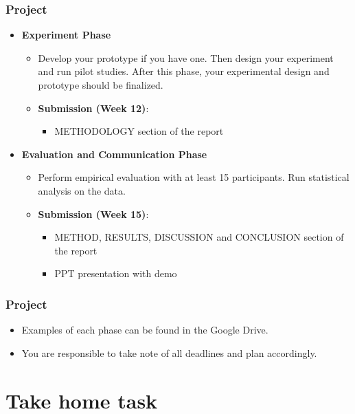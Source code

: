 \documentclass{beamer}
\begin{document}
\begin{frame}
\frametitle{Project}
\begin{itemize}
	\item \textbf{Experiment Phase}
	\begin{itemize}
		\item Develop your prototype if you have one.   Then design your experiment and run pilot studies.  After this phase, your experimental design and prototype should be finalized.
		\item \textbf{Submission (Week 12)}:
		\begin{itemize}
			\item METHODOLOGY section of the report
		\end{itemize}
	\end{itemize}
	\item \textbf{Evaluation and Communication Phase}
	\begin{itemize}
		\item Perform empirical evaluation with at least 15 participants.  Run statistical analysis on the data.  
		\item \textbf{Submission (Week 15)}:
		\begin{itemize}
			\item  METHOD, RESULTS, DISCUSSION and CONCLUSION section of the report
			\item  PPT presentation with demo
		\end{itemize}
	\end{itemize}
\end{itemize}
\end{frame}

\begin{frame}
\frametitle{Project}
\begin{itemize}
	\item Examples of each phase can be found in the Google Drive.
	\item You are responsible to take note of all deadlines and plan accordingly.
\end{itemize}
\end{frame}

\section{Take home task}
\end{document}
